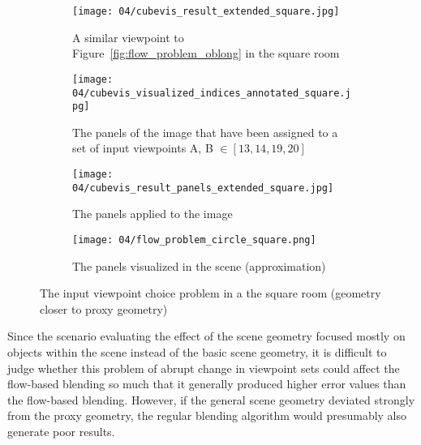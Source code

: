 \begin{figure}
\centering
    \hfill
    \begin{subfigure}[c]{0.45\textwidth}
            \centering
            \texttt{[image: 04/cubevis\_result\_extended\_square.jpg]}
            \caption{A similar viewpoint to Figure~\ref{fig:flow_problem_oblong} in the square room}
    \end{subfigure}
    \hfill
    \begin{subfigure}[c]{0.45\textwidth}
            \centering
            \texttt{[image: 04/cubevis\_visualized\_indices\_annotated\_square.jpg]}
            \caption{The panels of the image that have been assigned to a set of input viewpoints A, B $\in [13, 14, 19, 20]$}
    \end{subfigure}
    \hfill

    \hfill
    \begin{subfigure}[c]{0.45\textwidth}
            \centering
            \texttt{[image: 04/cubevis\_result\_panels\_extended\_square.jpg]}
            \caption{The panels applied to the image}
    \end{subfigure}
    \hfill
    \begin{subfigure}[c]{0.45\textwidth}
            \centering
            \texttt{[image: 04/flow\_problem\_circle\_square.png]}
            \caption{The panels visualized in the scene (approximation)}
    \end{subfigure}
    \hfill
  \caption{The input viewpoint choice problem in a the square room (geometry closer to proxy geometry)} \label{fig:flow_problem_square}
\end{figure}

Since the scenario evaluating the effect of the scene geometry focused mostly on objects within the scene instead of the basic scene geometry, it is difficult to judge whether this problem of abrupt change in viewpoint sets could affect the flow-based blending so much that it generally produced higher error values than the flow-based blending. However, if the general scene geometry deviated strongly from the proxy geometry, the regular blending algorithm would presumably also generate poor results.

